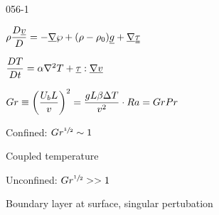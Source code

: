 \begin{mitframe}{056-1}
\begin{listone}
	\item $\dens\dfrac{\elecdisplace\uline{\vvel}}{\elecdisplace}=-\gradop\dynpress+(\dens-\dens_{0})\uline{\grav}+\gradop\uuline{\torque}$
    \item $\dfrac{\elecdisplace\Temp}{\elecdisplace{t}}=\tdiff\nabla^2\Temp+\uline{\torque}:\gradop\uline{\vvel}$
    \item $\grashof\equiv\bigg(\dfrac{\uvel_{b}\length}{\vvel}\bigg)^2=\dfrac{\grav\length\texpcoeff\iipf\Temp}{\vvel^2}\cdot\rayleigh=\grashof\prandtl$
    \item Confined: $\grashof^{\sfrac{1}{2}}\sim{1}$
    	\begin{listtwo}
        	\item Coupled temperature
       \end{listtwo}
	\item Unconfined: $\grashof^{\sfrac{1}{2}}>>1$
			\begin{listtwo}
            \item Boundary layer at surface, singular pertubation
            \end{listtwo}
\end{listone}    
\end{mitframe}